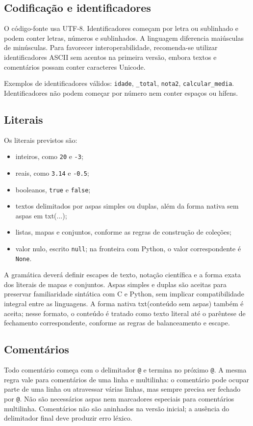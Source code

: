 \documentclass[12pt,a4paper]{article}
\begin{document}
\subsection{Codificação e identificadores}
O código-fonte usa UTF-8. Identificadores começam por letra ou sublinhado e podem conter letras, números e sublinhados. A linguagem diferencia maiúsculas de minúsculas. Para favorecer interoperabilidade, recomenda-se utilizar identificadores ASCII sem acentos na primeira versão, embora textos e comentários possam conter caracteres Unicode.

Exemplos de identificadores válidos: \texttt{idade}, \texttt{\_total}, \texttt{nota2}, \texttt{calcular\_media}. Identificadores não podem começar por número nem conter espaços ou hífens.

\subsection{Literais}
Os literais previstos são:
\begin{itemize}
\item inteiros, como \texttt{20} e \texttt{-3};
\item reais, como \texttt{3.14} e \texttt{-0.5};
\item booleanos, \texttt{true} e \texttt{false};
\item textos delimitados por aspas simples ou duplas, além da forma nativa sem aspas em txt(...);
\item listas, mapas e conjuntos, conforme as regras de construção de coleções;
\item valor nulo, escrito \texttt{null}; na fronteira com Python, o valor correspondente é \texttt{None}.
\end{itemize}
A gramática deverá definir escapes de texto, notação científica e a forma exata dos literais de mapas e conjuntos. Aspas simples e duplas são aceitas para preservar familiaridade sintática com C e Python, sem implicar compatibilidade integral entre as linguagens. A forma nativa txt(conteúdo sem aspas) também é aceita; nesse formato, o conteúdo é tratado como texto literal até o parêntese de fechamento correspondente, conforme as regras de balanceamento e escape.

\subsection{Comentários}
Todo comentário começa com o delimitador \texttt{@} e termina no próximo \texttt{@}. A mesma regra vale para comentários de uma linha e multilinha: o comentário pode ocupar parte de uma linha ou atravessar várias linhas, mas sempre precisa ser fechado por \texttt{@}. Não são necessários aspas nem marcadores especiais para comentários multilinha. Comentários não são aninhados na versão inicial; a ausência do delimitador final deve produzir erro léxico.
\end{document}
